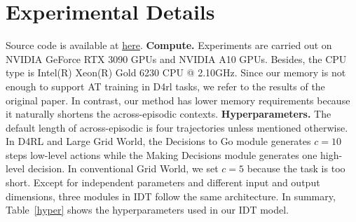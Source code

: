\documentclass{article}
\theoremstyle{plain}
\theoremstyle{definition}
\theoremstyle{remark}
\begin{document}
\section{Experimental Details}
\label{appendix B}
Source code is available at \href{https://github.com/SiliHuang-ai/IDT}{here}.
\noindent\textbf{Compute.}
Experiments are carried out on NVIDIA GeForce RTX 3090 GPUs and NVIDIA A10 GPUs.
Besides, the CPU type is Intel(R) Xeon(R) Gold 6230 CPU @ 2.10GHz.
Since our memory is not enough to support AT training in D4rl tasks, we refer to the results of the original paper. In contrast, our method has lower memory requirements because it naturally shortens the across-episodic contexts.
\noindent\textbf{Hyperparameters.}
The default length of across-episodic is four trajectories unless mentioned otherwise. In D4RL and Large Grid World, the Decisions to Go module generates $c=10$ steps low-level actions while the Making Decisions module generates one high-level decision. In conventional Grid World, we set $c=5$ because the task is too short. Except for independent parameters and different input and output dimensions, three modules in IDT follow the same architecture. In summary, Table~\ref{hyper} shows the hyperparameters used in our IDT model.
\end{document}
